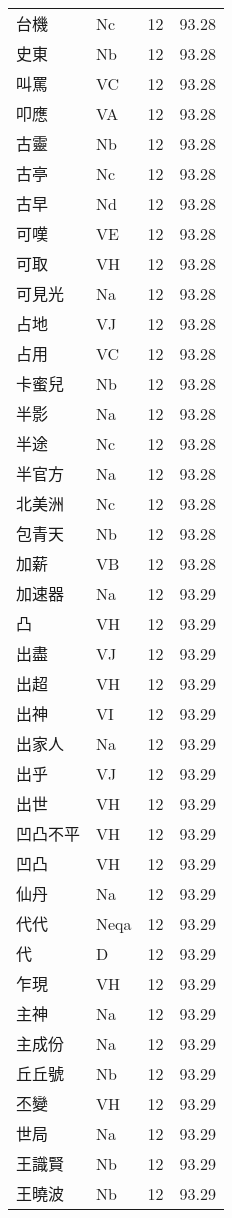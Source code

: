 \documentclass[twocolumn]{book}
\begin{document}
\begin{supertabular}{llrr}
台機 & Nc & 12 &  93.28\\
史東 & Nb & 12 &  93.28\\
叫罵 & VC & 12 &  93.28\\
叩應 & VA & 12 &  93.28\\
古靈 & Nb & 12 &  93.28\\
古亭 & Nc & 12 &  93.28\\
古早 & Nd & 12 &  93.28\\
可嘆 & VE & 12 &  93.28\\
可取 & VH & 12 &  93.28\\
可見光 & Na & 12 &  93.28\\
占地 & VJ & 12 &  93.28\\
占用 & VC & 12 &  93.28\\
卡蜜兒 & Nb & 12 &  93.28\\
半影 & Na & 12 &  93.28\\
半途 & Nc & 12 &  93.28\\
半官方 & Na & 12 &  93.28\\
北美洲 & Nc & 12 &  93.28\\
包青天 & Nb & 12 &  93.28\\
加薪 & VB & 12 &  93.28\\
加速器 & Na & 12 &  93.29\\
凸 & VH & 12 &  93.29\\
出盡 & VJ & 12 &  93.29\\
出超 & VH & 12 &  93.29\\
出神 & VI & 12 &  93.29\\
出家人 & Na & 12 &  93.29\\
出乎 & VJ & 12 &  93.29\\
出世 & VH & 12 &  93.29\\
凹凸不平 & VH & 12 &  93.29\\
凹凸 & VH & 12 &  93.29\\
仙丹 & Na & 12 &  93.29\\
代代 & Neqa & 12 &  93.29\\
代 & D & 12 &  93.29\\
乍現 & VH & 12 &  93.29\\
主神 & Na & 12 &  93.29\\
主成份 & Na & 12 &  93.29\\
丘丘號 & Nb & 12 &  93.29\\
丕變 & VH & 12 &  93.29\\
世局 & Na & 12 &  93.29\\
王識賢 & Nb & 12 &  93.29\\
王曉波 & Nb & 12 &  93.29\\

\end{supertabular}
\end{document}
